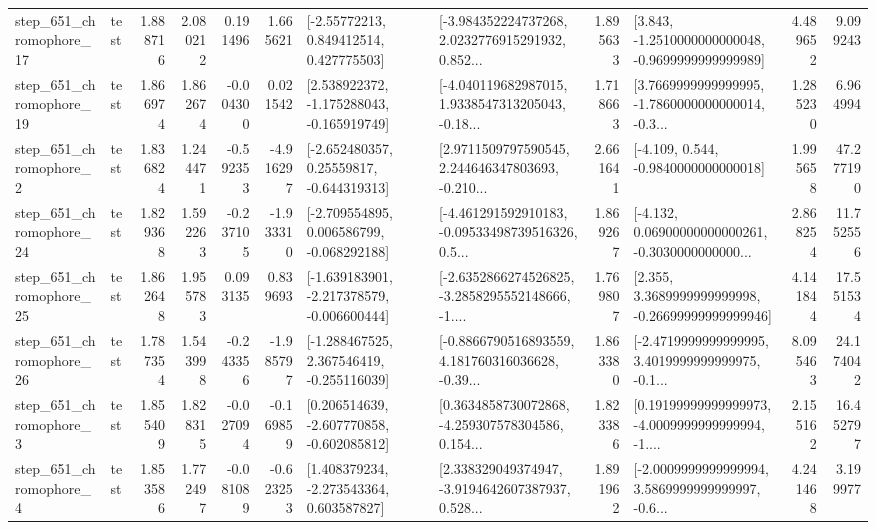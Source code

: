 \begin{tabular}{llrrrrllrlrr}
  step\_651\_chromophore\_17 &      test &      1.888716 &    2.080212 &      0.191496 &  1.665621 &     [-2.55772213, 0.849412514, 0.427775503] &  [-3.984352224737268, 2.0232776915291932, 0.852... &       1.895633 &  [3.843, -1.2510000000000048, -0.9699999999999989] &            4.489652 &          9.099243 \\
  step\_651\_chromophore\_19 &      test &      1.866974 &    1.862674 &     -0.004300 &  0.021542 &   [2.538922372, -1.175288043, -0.165919749] &  [-4.040119682987015, 1.9338547313205043, -0.18... &       1.718663 &  [3.7669999999999995, -1.7860000000000014, -0.3... &            1.285230 &          6.964994 \\
   step\_651\_chromophore\_2 &      test &      1.836824 &    1.244471 &     -0.592353 & -4.916297 &    [-2.652480357, 0.25559817, -0.644319313] &  [2.9711509797590545, 2.244646347803693, -0.210... &       2.661641 &               [-4.109, 0.544, -0.9840000000000018] &            1.995658 &         47.277190 \\
  step\_651\_chromophore\_24 &      test &      1.829368 &    1.592263 &     -0.237105 & -1.933310 &   [-2.709554895, 0.006586799, -0.068292188] &  [-4.461291592910183, -0.09533498739516326, 0.5... &       1.869267 &  [-4.132, 0.06900000000000261, -0.3030000000000... &            2.868254 &         11.752556 \\
  step\_651\_chromophore\_25 &      test &      1.862648 &    1.955783 &      0.093135 &  0.839693 &  [-1.639183901, -2.217378579, -0.006600444] &  [-2.6352866274526825, -3.2858295552148666, -1.... &       1.769807 &  [2.355, 3.3689999999999998, -0.26699999999999946] &            4.141844 &         17.551534 \\
  step\_651\_chromophore\_26 &      test &      1.787354 &    1.543998 &     -0.243356 & -1.985797 &   [-1.288467525, 2.367546419, -0.255116039] &  [-0.8866790516893559, 4.181760316036628, -0.39... &       1.863380 &  [-2.4719999999999995, 3.4019999999999975, -0.1... &            8.095463 &         24.174042 \\
   step\_651\_chromophore\_3 &      test &      1.855409 &    1.828315 &     -0.027094 & -0.169859 &   [0.206514639, -2.607770858, -0.602085812] &  [0.3634858730072868, -4.259307578304586, 0.154... &       1.823386 &  [0.19199999999999973, -4.0009999999999994, -1.... &            2.155162 &         16.452797 \\
   step\_651\_chromophore\_4 &      test &      1.853586 &    1.772497 &     -0.081089 & -0.623253 &    [1.408379234, -2.273543364, 0.603587827] &  [2.338329049374947, -3.9194642607387937, 0.528... &       1.891962 &  [-2.0009999999999994, 3.5869999999999997, -0.6... &            4.241468 &          3.199977 \\

\end{tabular}
